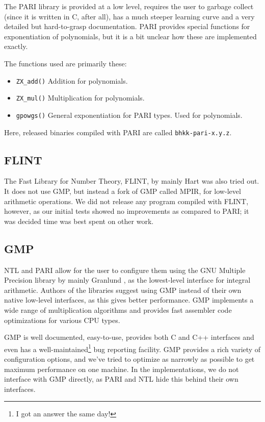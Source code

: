 \documentclass{cslthse-msc}
\newcommand{\code}{\texttt}
\begin{document}
The PARI library is provided at a low level, requires the user to garbage collect (since it is written in C, after all), has a much steeper learning curve and a very detailed but hard-to-grasp documentation. PARI provides special functions for exponentiation of polynomials, but it is a bit unclear how these are implemented exactly.

The functions used are primarily these: 

\begin{itemize}
\item \code{ZX\_add()}
\subitem Addition for polynomials. %
\item \code{ZX\_mul()}
\subitem Multiplication for polynomials. %
\item \code{gpowgs()}
\subitem General exponentiation for PARI types. Used for polynomials.
\end{itemize}

Here, released binaries compiled with PARI are called \code{bhkk-pari-x.y.z}.

\subsection{FLINT}
The Fast Library for Number Theory, FLINT, by mainly Hart \cite{flint} was also tried out. It does not use GMP, but instead a fork of GMP called MPIR, for low-level arithmetic operations. We did not release any program compiled with FLINT, however, as our initial tests showed no improvements as compared to PARI; it was decided time was best spent on other work.

\subsection{GMP}
NTL and PARI allow for the user to configure them using the GNU Multiple Precision library by mainly Granlund \cite{gmp}, as the lowest-level interface for integral arithmetic. Authors of the libraries suggest using GMP instead of their own native low-level interfaces, as this gives better performance. GMP implements a wide range of multiplication algorithms and provides fast assembler code optimizations for various CPU types.

GMP is well documented, easy-to-use, provides both C and C++ interfaces and even has a well-maintained\footnote{I got an answer the same day!} bug reporting facility. GMP provides a rich variety of configuration options, and we've tried to optimize as narrowly as possible to get maximum performance on one machine. In the implementations, we do not interface with GMP directly, as PARI and NTL hide this behind their own interfaces.
\end{document}
